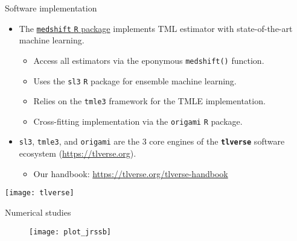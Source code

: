 \documentclass{beamer}
\begin{document}

\begin{frame}[c]{Software implementation}

\begin{center}
\begin{itemize}
  \itemsep2pt
  \item The \underline{\texttt{medshift} \texttt{R} package}
    \citep{hejazi2020medshift} implements TML estimator with state-of-the-art
    machine learning.
    \begin{itemize}
      \item Access all estimators via the eponymous \texttt{medshift()}
        function.
      \item Uses the \texttt{sl3} \texttt{R} package for ensemble machine
        learning.
      \item Relies on the \texttt{tmle3} framework for the TMLE implementation.
      \item Cross-fitting implementation via the \texttt{origami} \texttt{R}
        package.
    \end{itemize}
  \item \texttt{sl3}, \texttt{tmle3}, and \texttt{origami} are the 3 core
    engines of the \textbf{\texttt{tlverse}} software ecosystem
    (\url{https://tlverse.org}).
    \begin{itemize}
      \item Our handbook: \url{https://tlverse.org/tlverse-handbook}
    \end{itemize}
\end{itemize}
\texttt{[image: tlverse]}
\end{center}

\note{
}

\end{frame}



\begin{frame}{Numerical studies}
  \begin{figure}[H]
    \hspace*{-1.5cm}
    \centering
    \texttt{[image: plot\_jrssb]}
  \end{figure}

\note{
}

\end{frame}
\end{document}
